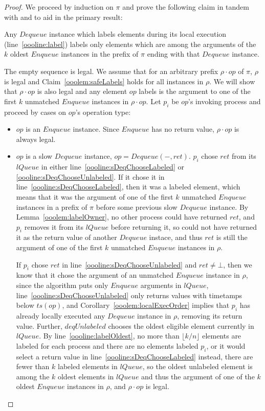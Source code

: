 \documentclass[a4paper,anonymous,USenglish]{lipics-v2021} %
\theoremstyle{definition}
\begin{document}
\begin{proof}
  We proceed by induction on $\pi$ and prove the following claim in tandem with and to aid in the primary result:

  \begin{claim}\label{ooolem:safeLabels}
    Any $Dequeue$ instance which labels elements during its local execution (line~\ref{oooline:label}) labels only elements which are among the arguments of the $k$ oldest $Enqueue$ instances in the prefix of $\pi$ ending with that $Dequeue$ instance.
  \end{claim}

  The empty sequence is legal.  We assume that for an arbitrary prefix $\rho \cdot op$ of $\pi$, $\rho$ is legal and Claim~\ref{ooolem:safeLabels} holds for all instances in $\rho$.  We will show that $\rho \cdot op$ is also legal and any element $op$ labels is the argument to one of the first $k$ unmatched $Enqueue$ instances in $\rho \cdot op$.  Let $p_i$ be $op$'s invoking process and proceed by cases on $op$'s operation type:
  \begin{itemize}
  \item $op$ is an $Enqueue$ instance.  Since $Enqueue$ has no return value, $\rho \cdot op$ is always legal.
%
  \item $op$ is a slow $Dequeue$ instance, $op = Dequeue(-,ret)$.  $p_i$ chose $ret$ from its $lQueue$ in either line~\ref{oooline:sDeqChooseLabeled} or \ref{oooline:sDeqChooseUnlabeled}.  If it chose it in line~\ref{oooline:sDeqChooseLabeled}, then it was a labeled element, which means that it was the argument of one of the first $k$ unmatched $Enqueue$ instances in a prefix of $\pi$ before some previous slow $Dequeue$ instance.  By Lemma~\ref{ooolem:labelOwner}, no other process could have returned $ret$, and $p_i$ removes it from its $lQueue$ before returning it, so could not have returned it as the return value of another $Dequeue$ instace, and thus $ret$ is still the argument of one of the first $k$ unmatched $Enqueue$ instances in $\rho$.

    If $p_i$ chose $ret$ in line~\ref{oooline:sDeqChooseUnlabeled} and $ret \neq \bot$, then we know that it chose the argument of an unmatched $Enqueue$ instance in $\rho$, since the algorithm puts only $Enqueue$ arguments in $lQueue$, line~\ref{oooline:sDeqChooseUnlabeled} only returns values with timetamps below $ts(op)$, and Corollary~\ref{ooolem:localExecOrder} implies that $p_i$ has already locally executed any $Dequeue$ instance in $\rho$, removing its return value.  Further, $deqUnlabeled$ chooses the oldest eligible element currently in $lQueue$.  By line~\ref{oooline:labelOldest}, no more than $\lfloor k/n\rfloor$ elements are labeled for each process and there are no elements labeled $p_i$, or it would select a return value in line~\ref{oooline:sDeqChooseLabeled} instead, there are fewer than $k$ labeled elements in $lQueue$, so the oldest unlabeled element is among the $k$ oldest elements in $lQueue$ and thus the argument of one of the $k$ oldest $Enqueue$ instances in $\rho$, and $\rho \cdot op$ is legal.


\end{itemize}
\end{proof}
\end{document}
